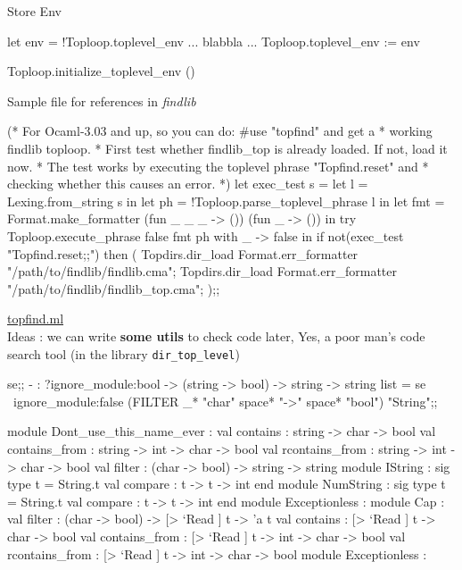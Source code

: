 Store Env

\begin{ocamlcode}
let env = !Toploop.toplevel_env
... blabbla ...     
Toploop.toplevel_env := env     

Toploop.initialize_toplevel_env ()  
\end{ocamlcode}

Sample file for references in \textit{findlib}


\begin{ocamlcode}
(* For Ocaml-3.03 and up, so you can do: #use "topfind" and get a
 * working findlib toploop.
 * First test whether findlib_top is already loaded. If not, load it now.
 * The test works by executing the toplevel phrase "Topfind.reset" and
 * checking whether this causes an error.
 *)
let exec_test s =
  let l = Lexing.from_string s in
  let ph = !Toploop.parse_toplevel_phrase l in
  let fmt = Format.make_formatter (fun _ _ _ -> ()) (fun _ -> ()) in
  try
    Toploop.execute_phrase false fmt ph
  with
      _ -> false
in
if not(exec_test "Topfind.reset;;") then (
  Topdirs.dir_load Format.err_formatter "/path/to/findlib/findlib.cma";
  Topdirs.dir_load Format.err_formatter "/path/to/findlib/findlib_top.cma";
);;
\end{ocamlcode}

    
\href{file:/Users/bob/SourceCode/ML/godi/build/distfiles/findlib-1.2.7/src/findlib/topfind.ml}{topfind.ml}\\ 
Ideas : we can write \textbf{some utils} to check code later, Yes,
a poor man's code search tool (in the library \verb|dir_top_level|)


\begin{ocamlcode}
se;;
- : ?ignore_module:bool -> (string -> bool) -> string -> string list =
se ~ignore_module:false (FILTER _*  "char" space* "->" space* "bool") "String";;
\end{ocamlcode}

\begin{ocamlcode}
module Dont_use_this_name_ever :
    val contains : string -> char -> bool
    val contains_from : string -> int -> char -> bool
    val rcontains_from : string -> int -> char -> bool
    val filter : (char -> bool) -> string -> string
    module IString : sig type t = String.t val compare : t -> t -> int end
    module NumString : sig type t = String.t val compare : t -> t -> int end
    module Exceptionless :
    module Cap :
        val filter : (char -> bool) -> [> `Read ] t -> 'a t
        val contains : [> `Read ] t -> char -> bool
        val contains_from : [> `Read ] t -> int -> char -> bool
        val rcontains_from : [> `Read ] t -> int -> char -> bool
        module Exceptionless :
\end{ocamlcode}

